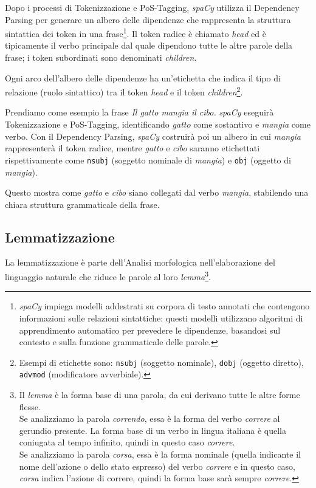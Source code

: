 \documentclass[12pt]{report}
\newcommand{\spacy}{\textsl{spaCy}\xspace}
\begin{document}
Dopo i processi di Tokenizzazione e PoS-Tagging, \spacy utilizza il Dependency Parsing per generare un albero delle dipendenze che rappresenta la struttura sintattica dei token in una frase\footnote{\spacy impiega modelli addestrati su corpora di testo annotati che contengono informazioni sulle relazioni sintattiche: questi modelli utilizzano algoritmi di apprendimento automatico per prevedere le dipendenze, basandosi sul contesto e sulla funzione grammaticale delle parole.}. Il token radice è chiamato \textit{head} ed è tipicamente il verbo principale dal quale dipendono tutte le altre parole della frase; i token subordinati sono denominati \textit{children}.

Ogni arco dell'albero delle dipendenze ha un'etichetta che indica il tipo di relazione (ruolo sintattico) tra il token \textit{head} e il token \textit{children}\footnote{Esempi di etichette sono: \texttt{nsubj} (soggetto nominale), \texttt{dobj} (oggetto diretto), \texttt{advmod} (modificatore avverbiale).}.


\begin{mdframed}
\small
Prendiamo come esempio la frase \textit{Il gatto mangia il cibo.} \spacy eseguirà Tokenizzazione e PoS-Tagging, identificando \textit{gatto} come sostantivo e \textit{mangia} come verbo. Con il Dependency Parsing, \spacy costruirà poi un albero in cui \textit{mangia} rappresenterà il token radice, mentre \textit{gatto} e \textit{cibo} saranno etichettati rispettivamente come \texttt{nsubj} (soggetto nominale di \textit{mangia}) e \texttt{obj} (oggetto di \textit{mangia}).

Questo mostra come \textit{gatto} e \textit{cibo} siano collegati dal verbo \textit{mangia}, stabilendo una chiara struttura grammaticale della frase.
\end{mdframed}


\subsection{Lemmatizzazione}
La lemmatizzazione è parte dell'\textsf{Analisi morfologica} nell'elaborazione del linguaggio naturale che riduce le parole al loro \textit{lemma}\footnote{Il \textit{lemma} è la forma base di una parola, da cui derivano tutte le altre forme flesse.\\
Se analizziamo la parola \textit{correndo}, essa è la forma del verbo \textit{correre} al gerundio presente. La forma base di un verbo in lingua italiana è quella coniugata al tempo infinito, quindi in questo caso \textit{correre}.\\
Se analizziamo la parola \textit{corsa}, essa è la forma nominale (quella indicante il nome dell'azione o dello stato espresso) del verbo \textit{correre} e in questo caso, \textit{corsa} indica l'azione di correre, quindi la forma base sarà sempre \textit{correre}.\label{fn:lemma}}.
\end{document}
